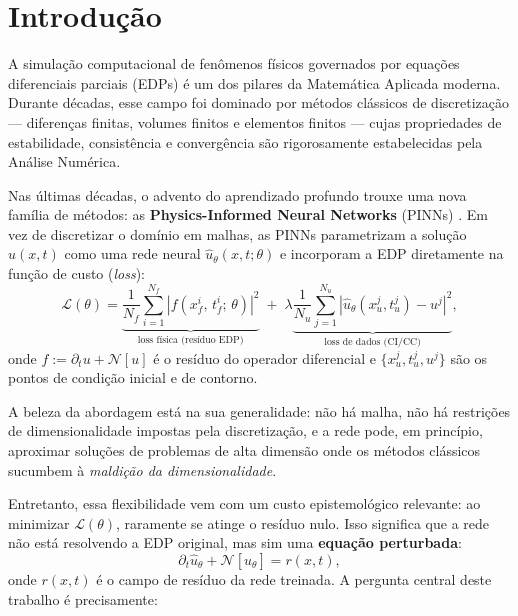 \documentclass[12pt, a4paper]{article}
\theoremstyle{definition}
\newcommand{\loss}{\mathcal{L}}
\newcommand{\pinn}{\hat{u}_\theta}
\newcommand{\abs}[1]{\left| #1 \right|}
\begin{document}
\tableofcontents
\newpage

\section{Introdução}

A simulação computacional de fenômenos físicos governados por equações diferenciais parciais
(EDPs) é um dos pilares da Matemática Aplicada moderna. Durante décadas, esse campo foi
dominado por métodos clássicos de discretização --- diferenças finitas, volumes finitos e
elementos finitos --- cujas propriedades de estabilidade, consistência e convergência são
rigorosamente estabelecidas pela Análise Numérica.

Nas últimas décadas, o advento do aprendizado profundo trouxe uma nova família de métodos:
as \textbf{Physics-Informed Neural Networks} (PINNs) \cite{raissi2019}. Em vez de discretizar
o domínio em malhas, as PINNs parametrizam a solução $u(x,t)$ como uma rede neural
$\pinn(x,t; \theta)$ e incorporam a EDP diretamente na função de custo (\textit{loss}):
\begin{equation}
    \loss(\theta) = \underbrace{\frac{1}{N_f}\sum_{i=1}^{N_f}
        \abs{f(x_f^i,\, t_f^i;\,\theta)}^2}_{\text{loss física (resíduo EDP)}}
    \;+\;
    \lambda\underbrace{\frac{1}{N_u}\sum_{j=1}^{N_u}
        \abs{\pinn(x_u^j,t_u^j) - u^j}^2}_{\text{loss de dados (CI/CC)}},
    \label{eq:loss_total}
\end{equation}
onde $f := \partial_t u + \mathcal{N}[u]$ é o resíduo do operador diferencial e
$\{x_u^j, t_u^j, u^j\}$ são os pontos de condição inicial e de contorno.

A beleza da abordagem está na sua generalidade: não há malha, não há restrições de
dimensionalidade impostas pela discretização, e a rede pode, em princípio, aproximar
soluções de problemas de alta dimensão onde os métodos clássicos sucumbem à
\textit{maldição da dimensionalidade}.

Entretanto, essa flexibilidade vem com um custo epistemológico relevante: ao minimizar
$\loss(\theta)$, raramente se atinge o resíduo nulo. Isso significa que a rede não está
resolvendo a EDP original, mas sim uma \textbf{equação perturbada}:
\begin{equation}
    \partial_t \pinn + \mathcal{N}[\pinn] = r(x, t),
    \label{eq:edp_perturbada}
\end{equation}
onde $r(x,t)$ é o campo de resíduo da rede treinada. A pergunta central deste trabalho
é precisamente:
\end{document}
